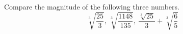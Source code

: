 Compare the magnitude of the following three numbers.
$$
        \sqrt[3]{\frac{25}{3}} ,\, \sqrt[3]{\frac{1148}{135}} ,\, \frac{\sqrt[3]{25}}{3} + \sqrt[3]{\frac{6}{5}}
    $$